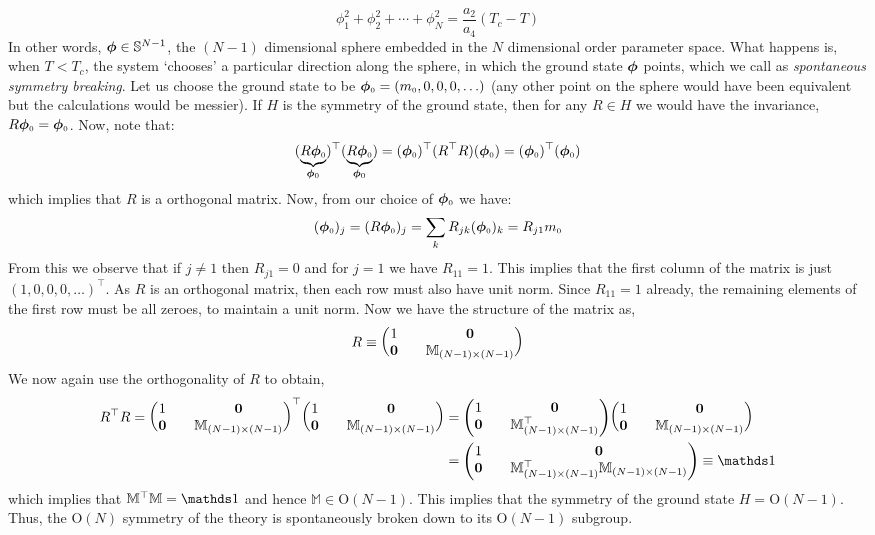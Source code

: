  $$\phi_1^2+\phi_2^2+\cdots+\phi_N^2 = \frac{a_2}{a_4}(T_c-T)$$
In other words, $\boldsymbol{\phi}\in \mathbb{S}^{N-1}$, the $(N-1)$ dimensional sphere embedded in the $N$ dimensional order parameter space. What happens is, when $T<T_c$, the system `chooses' a particular direction along the sphere, in which the ground state $\boldsymbol{\phi}$ points, which we call as \textit{spontaneous symmetry breaking}. Let us choose the ground state to be $\boldsymbol{\phi}_{\text{\tiny 0}} = (m_{\text{\tiny 0}},0,0,0,\ldots)$ (any other point on the sphere would have been equivalent but the calculations would be messier). If $H$ is the symmetry of the ground state, then for any $R\in H$ we would have the invariance, $R\boldsymbol{\phi}_{\text{\tiny 0}} = \boldsymbol{\phi}_{\text{\tiny 0}}$. Now, note that:
$$(\underbrace{R\boldsymbol{\phi}_{\text{\tiny 0}}}_{\boldsymbol{\phi}_{\text{\tiny 0}} } )^{\top} (\underbrace{R\boldsymbol{\phi}_{\text{\tiny 0}}}_{\boldsymbol{\phi}_{\text{\tiny 0}} }) = (\boldsymbol{\phi}_{\text{\tiny 0}} )^{\top}(R^\top R )(\boldsymbol{\phi}_{\text{\tiny 0}} ) = (\boldsymbol{\phi}_{\text{\tiny 0}} )^\top (\boldsymbol{\phi}_{\text{\tiny 0}} ) $$
which implies that $R$ is a orthogonal matrix. Now, from our choice of $\boldsymbol{\phi}_{\text{\tiny 0}} $ we have:
$$(\boldsymbol{\phi}_{\text{\tiny 0}} )_j = (R\boldsymbol{\phi}_{\text{\tiny 0}} )_j = \sum\limits_k R_{jk}(\boldsymbol{\phi}_{\text{\tiny 0}} )_k = R_{j1}m_{\text{\tiny 0}}$$
From this we observe that if $j\neq 1$ then $R_{j1} =0$ and for $j=1$ we have $R_{11}=1$. This implies that the first column of the matrix is just $(1,0,0,0,\ldots)^\top$. As $R$ is an orthogonal matrix, then each row must also have unit norm. Since $R_{11}=1$ already, the remaining elements of the first row must be all zeroes, to maintain a unit norm. Now we have the structure of the matrix as, 
\begin{align*}
  R \equiv  \mqty(1 && \mathbf{0} \\ \mathbf{0} && \mathbb{M}_{(N-1)\times (N-1)})
\end{align*}
We now again use the orthogonality of $R$ to obtain,
\begin{align*}
  R^\top R =  \mqty(1 && \mathbf{0} \\ \mathbf{0} && \mathbb{M}_{(N-1)\times (N-1)})^\top \mqty(1 && \mathbf{0} \\ \mathbf{0} && \mathbb{M}_{(N-1)\times (N-1)}) &= \mqty(1 && \mathbf{0} \\ \mathbf{0} && \mathbb{M}_{(N-1)\times (N-1)}^\top)\mqty(1 && \mathbf{0} \\ \mathbf{0} && \mathbb{M}_{(N-1)\times (N-1)}) \\
  &=\mqty(1 && \mathbf{0} \\ \mathbf{0} && \mathbb{M}_{(N-1)\times (N-1)}^\top\mathbb{M}_{(N-1)\times (N-1)}) \equiv \iden
\end{align*}
which implies that $\mathbb{M}^\top \mathbb{M}= \iden$ and hence $\mathbb{M} \in \mathrm{O}(N-1)$. This implies that the symmetry of the ground state $H=\mathrm{O}(N-1)$. Thus, the $\mathrm{O}(N)$ symmetry of the theory is spontaneously broken down to its $\mathrm{O}(N-1)$ subgroup.\\[0.2cm]
